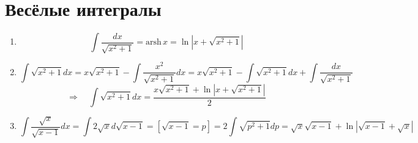\section{Весёлые интегралы}

\begin{enumerate}
	\item 
	\[
		\int \frac{dx}{\sqrt{x^2 + 1}} = \mathrm{arsh\,}x = \ln |x + \sqrt{x^2 + 1}|
	\]
	\item
	\[
		\int \sqrt{x^2 + 1} dx = 
		x \sqrt{x^2 + 1} - \int \frac{x^2}{\sqrt{x^2 + 1}}dx =
		x \sqrt{x^2 + 1} - \int \sqrt{x^2 + 1}dx + \int \frac{dx}{\sqrt{x^2 + 1}}
	\]
	\[
		\Rightarrow \quad
		\int \sqrt{x^2 + 1} dx = \frac{x \sqrt{x^2 + 1} + \ln |x + \sqrt{x^2 + 1}|}{2}
	\]
	\item
	\[
		\int \frac{\sqrt{x}}{\sqrt{x-1}} dx = 
		\int 2 \sqrt{x} d\sqrt{x-1} =
		[\sqrt{x - 1} = p]
		= 2 \int \sqrt{p^2 + 1} dp = 
		\sqrt{x} \sqrt{x-1}+ \ln |\sqrt{x - 1} + \sqrt{x}|
	\]
\end{enumerate}